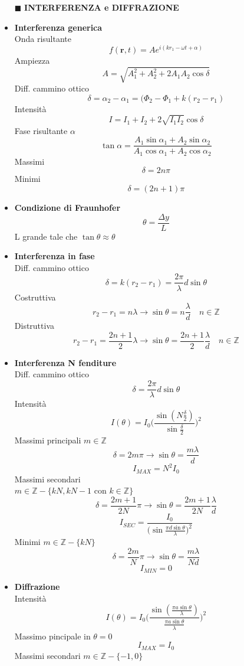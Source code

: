 \documentclass{book}
\newcommand{\g}{\textbf}
\newcommand{\h}{\mathbf}
\newcommand{\e}{\begin{equation}}
\newcommand{\ex}{\end{equation} }
\renewcommand{\it}{\item[$\cdot$]}
\begin{document}
\begin{multicols}{4}
\begin{itemize}
\item [$\blacksquare$] \g{INTERFERENZA e DIFFRAZIONE}  \\  
    \it \g{Interferenza generica} \\
        Onda risultante
        \e{f(\h{r},t)=Ae^{i(kr_1-\omega t+\alpha)}} \ex
        Ampiezza
        \e{A=\sqrt{A_1^2+A_2^2+2A_1A_2\cos\delta}} \ex
        Diff. cammino ottico
        \e{\delta=\alpha_2-\alpha_1=(\Phi_2-\Phi_1+k(r_2-r_1)} \ex
        Intensità
        \e{I=I_1+I_2+2\sqrt{I_1I_2}\cos{\delta}} \ex
        Fase risultante $\alpha$
        \e{\tan\alpha=\frac{A_1\sin{\alpha_1}+A_2\sin{\alpha_2}}{A_1\cos{\alpha_1}+A_2\cos{\alpha_2}}} \ex
        Massimi
        \e{\delta=2n\pi} \ex
        Minimi
        \e{\delta=(2n+1)\pi } \ex
    \it \g{Condizione di Fraunhofer} \\
        \e{\theta=\frac{\Delta y}{L}} \ex
        L grande tale che $\tan\theta\approx\theta$     
    \it \g{Interferenza in fase} \\
        Diff. cammino ottico
        \e{\delta=k(r_2-r_1)=\frac{2\pi}{\lambda}d\sin{\theta}} \ex
        Costruttiva
        \e{r_2-r_1=n\lambda \rightarrow \sin{\theta}=n\frac{\lambda}{d} \quad n\in\mathbb{Z}} \ex
        Distruttiva
        \e{r_2-r_1=\frac{2n+1}{2}\lambda \rightarrow \sin{\theta}=\frac{2n+1}{2}\frac{\lambda}{d} \quad n\in\mathbb{Z}} \ex
        \it \g{Interferenza N fenditure} \\
        Diff. cammino ottico
        \e{\delta=\frac{2\pi}{\lambda}d\sin{\theta}} \ex
        Intensità
        \e{I(\theta)=I_0\biggl(\frac{\sin(N\frac{\delta}{2})}{\sin\frac{\delta}{2}}\biggr)^2} \ex
        Massimi principali $m\in\mathbb{Z}$
        \e{\delta=2m\pi \rightarrow \sin\theta=\frac{m\lambda}{d}} \ex
        \e{I_{MAX}=N^2I_0} \ex
        Massimi secondari \\
        $m\in\mathbb{Z}-\{kN,kN-1$ con $k\in\mathbb{Z}\}$
        \e{\delta=\frac{2m+1}{2N}\pi \rightarrow \sin\theta=\frac{2m+1}{2N}\frac{\lambda}{d}} \ex
        \e{I_{SEC}=\frac{I_0}{\bigl(\sin\frac{\pi d \sin\theta}{\lambda} \bigr)^2}} \ex
        Minimi $m\in\mathbb{Z}-\{kN\}$
        \e{\delta=\frac{2m}{N}\pi \rightarrow \sin\theta=\frac{m\lambda}{Nd}} \ex
        \e{I_{MIN}=0}\ex
    \it \g{Diffrazione} \\
        Intensità
        \e{I(\theta)=I_{0}\biggl(\frac{\sin(\frac{\pi a \sin\theta}{\lambda})}{\frac{\pi a \sin\theta}{\lambda}} \biggr)^2} \ex
        Massimo pincipale in $\theta=0$ \\
        \e{I_{MAX}=I_0} \ex
        Massimi secondari $m\in\mathbb{Z}-\{-1,0\}$

\end{itemize}
\end{multicols}
\end{document}
